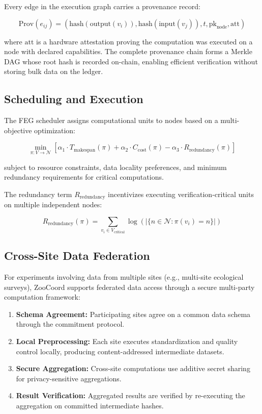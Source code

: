 \documentclass[11pt,a4paper]{article}
\begin{document}
Every edge in the execution graph carries a provenance record:

\begin{equation}
    \text{Prov}(e_{ij}) = (\text{hash}(\text{output}(v_i)), \text{hash}(\text{input}(v_j)), t, \text{pk}_{\text{node}}, \text{att})
\end{equation}

\noindent where $\text{att}$ is a hardware attestation proving the computation was executed on a node with declared capabilities.
The complete provenance chain forms a Merkle DAG whose root hash is recorded on-chain, enabling efficient verification without storing bulk data on the ledger.

\subsection{Scheduling and Execution}

The FEG scheduler assigns computational units to nodes based on a multi-objective optimization:

\begin{equation}
    \min_{\pi: V \rightarrow \mathcal{N}} \left[\alpha_1 \cdot T_{\text{makespan}}(\pi) + \alpha_2 \cdot C_{\text{cost}}(\pi) - \alpha_3 \cdot R_{\text{redundancy}}(\pi)\right]
\end{equation}

\noindent subject to resource constraints, data locality preferences, and minimum redundancy requirements for critical computations.

The redundancy term $R_{\text{redundancy}}$ incentivizes executing verification-critical units on multiple independent nodes:

\begin{equation}
    R_{\text{redundancy}}(\pi) = \sum_{v_i \in V_{\text{critical}}} \log\left(|\{n \in \mathcal{N} : \pi(v_i) = n\}|\right)
\end{equation}

\subsection{Cross-Site Data Federation}

For experiments involving data from multiple sites (e.g., multi-site ecological surveys), ZooCoord supports federated data access through a secure multi-party computation framework:

\begin{enumerate}[leftmargin=*]
    \item \textbf{Schema Agreement:} Participating sites agree on a common data schema through the commitment protocol.
    \item \textbf{Local Preprocessing:} Each site executes standardization and quality control locally, producing content-addressed intermediate datasets.
    \item \textbf{Secure Aggregation:} Cross-site computations use additive secret sharing for privacy-sensitive aggregations.
    \item \textbf{Result Verification:} Aggregated results are verified by re-executing the aggregation on committed intermediate hashes.
\end{enumerate}
\end{document}

